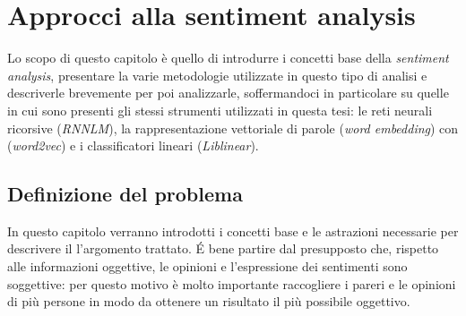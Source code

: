 \documentclass[a4paper,12pt,openright,twoside]{report}
\makeatletter
\theoremstyle{definition}
\def\cleardoublepage{\clearpage\if@twoside \ifodd\c@page\else
\hbox{}
\vspace*{\fill}
\begin{center}
\textit{}
\end{center}
\vspace{\fill}
\thispagestyle{empty}
\newpage
\if@twocolumn\hbox{}\newpage\fi\fi\fi}
\makeatother
\begin{document}
\clearpage{\pagestyle{empty}\cleardoublepage}
\tableofcontents                        %
\rhead[\fancyplain{}{\bfseries\leftmark}]{\fancyplain{}{\bfseries\thepage}}

\lhead[\fancyplain{}{\bfseries\thepage}]{\fancyplain{}{\bfseries\rightmark}}


\chapter{Approcci alla sentiment analysis}

Lo scopo di questo capitolo è quello di introdurre i concetti base della \emph{sentiment analysis}, 
presentare la varie metodologie utilizzate in questo tipo di analisi e descriverle brevemente per poi 
analizzarle, soffermandoci in particolare su quelle in cui sono presenti gli stessi strumenti 
utilizzati in questa tesi: le reti neurali ricorsive (\emph{RNNLM}), 
la rappresentazione vettoriale di parole (\emph{word embedding})
con (\emph{word2vec}) e 
i classificatori lineari (\emph{Liblinear}).

\section{Definizione del problema}
In questo capitolo verranno introdotti i concetti base e le astrazioni necessarie
per descrivere il l'argomento trattato.
\'E bene partire dal presupposto che, rispetto alle informazioni oggettive, 
le opinioni e l'espressione dei sentimenti sono
soggettive: per questo motivo è molto importante raccogliere i pareri e le opinioni di più persone
in modo da ottenere un risultato il più possibile oggettivo.
\end{document}
